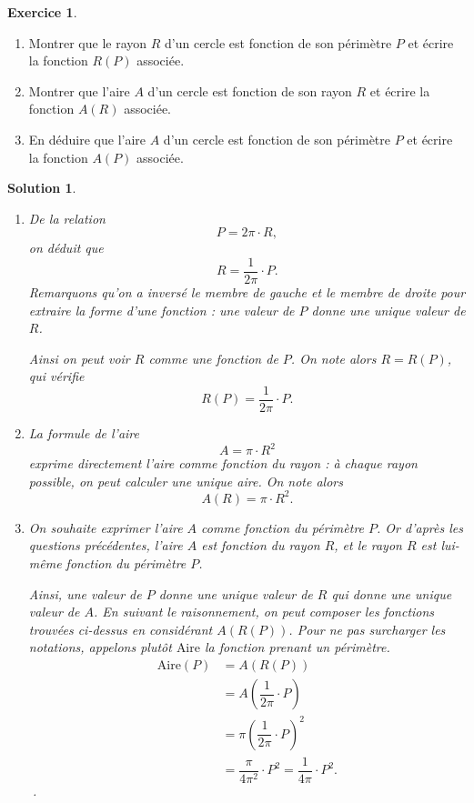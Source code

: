 \documentclass[a4paper, 14pt]{extarticle}
\theoremstyle{plain}
\newtheorem*{sol}{Solution}
\theoremstyle{definition}
\newtheorem{ex}{Exercice}
\newcommand{\exe}[2]{
		\begin{ex} #1  \end{ex}
		\begin{sol} #2 \end{sol}
	}
\newcommand{\exe}[2]{
		\begin{ex} #1  \end{ex}
	}
\begin{document}
	
	\exe{
		\begin{enumerate}
			\item
			Montrer que le rayon $R$ d'un cercle est fonction de son périmètre $P$ et écrire la fonction $R(P)$ associée.
			\item
			Montrer que l'aire $A$ d'un cercle est fonction de son rayon $R$ et écrire la fonction $A(R)$ associée.
			\item
			En déduire que l'aire $A$ d'un cercle est fonction de son périmètre $P$ et écrire la fonction $A(P)$ associée.
		\end{enumerate}
	}{
		\begin{enumerate}
			\item
			De la relation 
				\[ P = 2\pi \cdot R, \]
			on déduit que 
				\[ R = \dfrac{1}{2\pi} \cdot P. \]
			Remarquons qu'on a inversé le membre de gauche et le membre de droite pour extraire la forme d'une fonction : une valeur de $P$ donne une unique valeur de $R$.
			
			Ainsi on peut voir $R$ comme une fonction de $P$. On note alors $R=R(P)$, qui vérifie
			\[ R(P) = \dfrac{1}{2\pi} \cdot P. \]
			
			\item 
			La formule de l'aire
				\[ A = \pi \cdot R^2 \]
			exprime directement l'aire comme fonction du rayon : à chaque rayon possible, on peut calculer une unique aire.
			On note alors
				\[ A(R) =  \pi \cdot R^2. \]
			\item
			On souhaite exprimer l'aire $A$ comme fonction du périmètre $P$.
			Or d'après les questions précédentes, l'aire $A$ est fonction du rayon $R$, et le rayon $R$ est lui-même fonction du périmètre $P$.
			
			Ainsi, une valeur de $P$ donne une unique valeur de $R$ qui donne une unique valeur de $A$.
			En suivant le raisonnement, on peut composer les fonctions trouvées ci-dessus en considérant $A(R(P))$.
			Pour ne pas surcharger les notations, appelons plutôt $\text{Aire}$ la fonction prenant un périmètre.
				\begin{align*}
				 \text{Aire}(P) &= A(R(P)) \\ &=A(\dfrac{1}{2\pi} \cdot P) \\ &= \pi \left( \dfrac{1}{2\pi} \cdot P \right)^2 \\ &= \dfrac{\pi}{4\pi^2} \cdot P^2 = \dfrac{1}{4\pi} \cdot P^2.
				 \end{align*}
		·\end{enumerate}
	}
	
\end{document}
